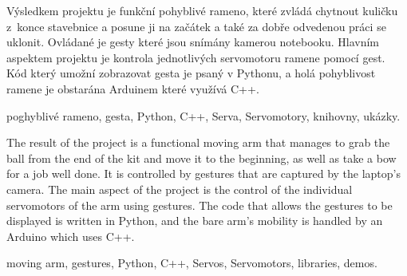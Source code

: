 \documentclass[12pt, a4paper,
twoside,        %
openright
]{report}
\begin{document}
{%

	\noindent 
	Výsledkem projektu je funkční pohyblivé rameno, které zvládá chytnout kuličku z~konce stavebnice a posune ji na začátek a také za dobře odvedenou práci se uklonit. Ovládané je gesty které jsou snímány kamerou notebooku. Hlavním aspektem projektu je kontrola jednotlivých servomotoru ramene pomocí gest. Kód který umožní zobrazovat  gesta je psaný v Pythonu, a holá pohyblivost ramene je obstarána Arduinem které využívá C++. 
	
	
	\vspace{18pt}
	
	
	\noindent poghyblivé rameno, gesta, Python, C++, Serva, Servomotory, knihovny, ukázky. 
	
	\vspace{18pt}

	
	\noindent The result of the project is a functional moving arm that manages to grab the ball from the end of the kit and move it to the beginning, as well as take a bow for a job well done. It is controlled by gestures that are captured by the laptop's camera. The main aspect of the project is the control of the individual servomotors of the arm using gestures. The code that allows the gestures to be displayed is written in Python, and the bare arm's mobility is handled by an Arduino which uses C++. 
	
	
	\vspace{18pt}
	
	
	\noindent moving arm, gestures, Python, C++, Servos, Servomotors, libraries, demos.
	
	\cleardoublepage %

	
	\tableofcontents %

	\setcounter{page}{1} %

}
\end{document}
